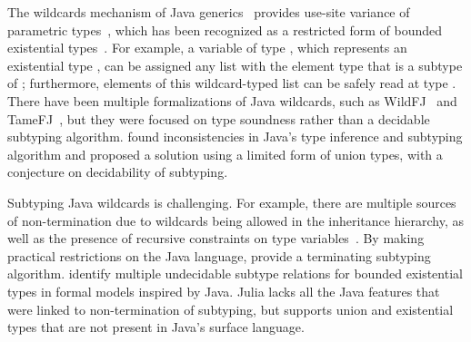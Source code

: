 The wildcards mechanism of Java generics~\cite{torgersen:wildcards:2004}
provides use-site variance of parametric types~\cite{thorup:unif-genericity:1999},
which has been recognized as a restricted form of bounded existential
types~\cite{igarashi:variance:2002}.
For example, a variable of type ,
which represents an existential type ,
can be assigned any list with the element type that is a subtype of ;
furthermore, elements of this wildcard-typed list can be safely read at
type .
There have been multiple formalizations of Java wildcards,
such as WildFJ~\cite{torgersen:wildfj:2005} and
TameFJ~\cite{cameron:java-wildcards:2008}, but they
were focused on type soundness rather than a decidable subtyping algorithm.
\citet{smith:java-type-inf:2008} found inconsistencies in Java's type inference
and subtyping algorithm and proposed a solution using a limited form of union
types, with a conjecture on decidability of subtyping.

Subtyping Java wildcards is challenging.
For example, there are multiple sources of non-termination due to wildcards
being allowed in the inheritance hierarchy,
as well as the presence of recursive constraints on type
variables~\cite{tate:taming-wildcards:2011}.
By making practical restrictions on the Java language,
\citet{tate:taming-wildcards:2011} provide a terminating subtyping algorithm.
\citet{wehr:dec-bounded-exist:2009} identify multiple undecidable subtype
relations for bounded existential types in formal models inspired by Java.
Julia lacks all the Java features that were linked to non-termination of
subtyping, but supports union and existential types that are not present
in Java's surface language.
